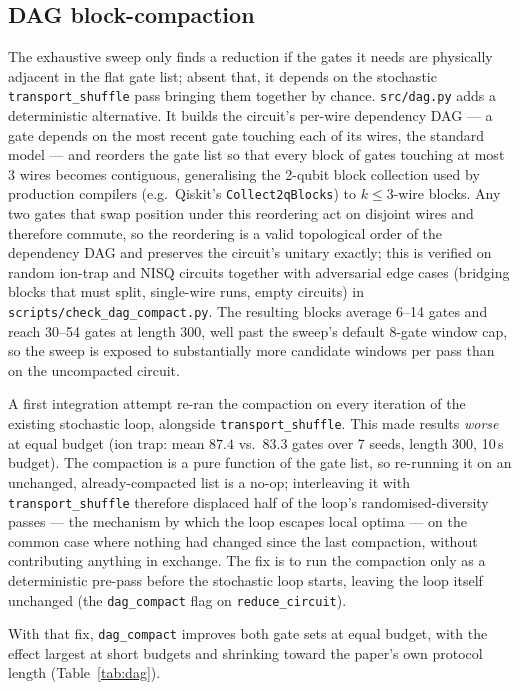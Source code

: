 \documentclass[11pt,a4paper]{article}
\begin{document}
\subsection{DAG block-compaction}
\label{sec:dag}
The exhaustive sweep only finds a reduction if the gates it needs are
physically adjacent in the flat gate list; absent that, it depends on the
stochastic \texttt{transport\_shuffle} pass bringing them together by
chance. \texttt{src/dag.py} adds a deterministic alternative. It builds the
circuit's per-wire dependency DAG --- a gate depends on the most recent gate
touching each of its wires, the standard model --- and reorders the gate
list so that every block of gates touching at most 3 wires becomes
contiguous, generalising the 2-qubit block collection used by production
compilers (e.g.\ Qiskit's \texttt{Collect2qBlocks}) to $k\leq 3$-wire
blocks. Any two gates that swap position under this reordering act on
disjoint wires and therefore commute, so the reordering is a valid
topological order of the dependency DAG and preserves the circuit's unitary
exactly; this is verified on random ion-trap and NISQ circuits together with
adversarial edge cases (bridging blocks that must split, single-wire runs,
empty circuits) in \texttt{scripts/check\_dag\_compact.py}. The resulting
blocks average 6--14 gates and reach 30--54 gates at length 300, well past
the sweep's default 8-gate window cap, so the sweep is exposed to
substantially more candidate windows per pass than on the uncompacted
circuit.

A first integration attempt re-ran the compaction on every iteration of the
existing stochastic loop, alongside \texttt{transport\_shuffle}. This made
results \emph{worse} at equal budget (ion trap: mean $87.4$ vs.\ $83.3$
gates over 7 seeds, length 300, 10\,s budget). The compaction is a pure
function of the gate list, so re-running it on an unchanged,
already-compacted list is a no-op; interleaving it with
\texttt{transport\_shuffle} therefore displaced half of the loop's
randomised-diversity passes --- the mechanism by which the loop escapes
local optima --- on the common case where nothing had changed since the
last compaction, without contributing anything in exchange. The fix is to
run the compaction only as a deterministic pre-pass before the stochastic
loop starts, leaving the loop itself unchanged (the \texttt{dag\_compact}
flag on \texttt{reduce\_circuit}).

With that fix, \texttt{dag\_compact} improves both gate sets at equal
budget, with the effect largest at short budgets and shrinking toward the
paper's own protocol length (Table~\ref{tab:dag}).
\end{document}
